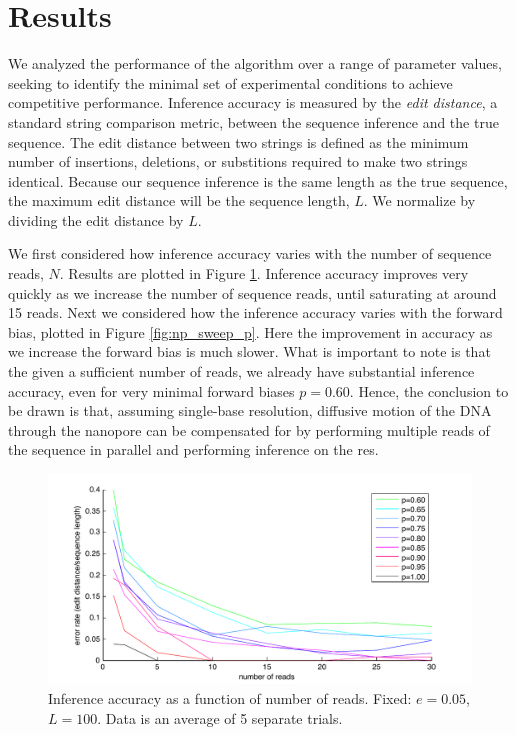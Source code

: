 \documentclass[12pt]{article}
\begin{document}
\section{Results}
We analyzed the performance of the algorithm over a range of parameter values, seeking to identify the minimal set of experimental conditions to achieve competitive performance.
Inference accuracy is measured by the \emph{edit distance}, a standard string comparison metric, between the sequence inference and the true sequence.
The edit distance between two strings is defined as the minimum number of insertions, deletions, or substitions required to make two strings identical.
Because our sequence inference is the same length as the true sequence, the maximum edit distance will be the sequence length, $L$.
We normalize by dividing the edit distance by $L$.

We first considered how inference accuracy varies with the number of sequence reads, $N$.
Results are plotted in Figure \ref{fig:np_sweep_n}.
Inference accuracy improves very quickly as we increase the number of sequence reads, until saturating at around 15 reads.
Next we considered how the inference accuracy varies with the forward bias, plotted in Figure \ref{fig:np_sweep_p}.
Here the improvement in accuracy as we increase the forward bias is much slower.
What is important to note is that the given a sufficient number of reads, we already have substantial inference accuracy, even for very minimal forward biases $p=0.60$.
Hence, the conclusion to be drawn is that, assuming single-base resolution, diffusive motion of the DNA through the nanopore can be compensated for by performing multiple reads of the sequence in parallel and performing inference on the res.

\begin{figure}
\centering
\includegraphics[width=1\textwidth]{fig/np_sweep_n.pdf}
\caption{Inference accuracy as a function of number of reads. Fixed: $e=0.05$, $L=100$. Data is an average of 5 separate trials.}
\label{fig:np_sweep_n}
\end{figure}
\end{document}
